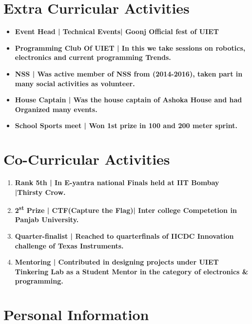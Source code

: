 \documentclass[11pt]{article}
\begin{document}
\begin{minipage}{18cm}



\section{Extra Curricular Activities}
\begin{itemize}[leftmargin=*]
\item \bfseries Event Head \mdseries | Technical Events| Goonj Official fest of UIET
\item \bfseries Programming Club Of UIET  \mdseries | In this we take sessions on robotics, electronics and current programming Trends.
\item \bfseries NSS \mdseries | Was active member of NSS from (2014-2016), taken part in many social activities as volunteer.
  
\item \bfseries House Captain \mdseries | Was the house captain of Ashoka House and had Organized many events.
\item \bfseries School Sports meet \mdseries | Won 1st prize in 100 and 200 meter sprint.
\end{itemize}

\fontsize{10pt}{18pt}\selectfont

\section{Co-Curricular Activities}
\begin{enumerate}[leftmargin=*]
\item \bfseries Rank 5th | \mdseries In E-yantra national Finals held at IIT Bombay |Thirsty Crow.
\item \bfseries 2\textsuperscript{st} Prize \mdseries | CTF(Capture the Flag)| Inter college Competetion in Panjab University.

\item \bfseries Quarter-finalist | \mdseries Reached to quarterfinals of IICDC Innovation challenge of Texas Instruments.
\item \bfseries Mentoring \mdseries | Contributed in designing projects under UIET Tinkering Lab as a Student Mentor in the category of electronics \& programming.
\end{enumerate}

\section{Personal Information}
\begin{itemize}[leftmargin=*]



\end{itemize}
\end{minipage}
\end{document}
